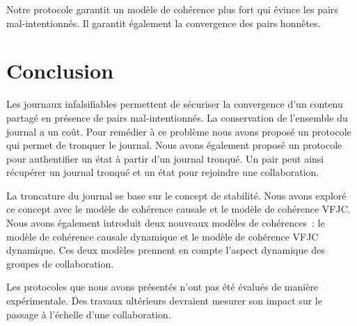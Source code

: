 Notre protocole garantit un modèle de cohérence plus fort qui évince les pairs mal-intentionnés.
Il garantit également la convergence des pairs honnêtes.



\section{Conclusion}

Les journaux infalsifiables permettent de sécuriser la convergence d'un contenu partagé en présence de pairs mal-intentionnés.
La conservation de l'ensemble du journal a un coût.
Pour remédier à ce problème nous avons proposé un protocole qui permet de tronquer le journal.
Nous avons également proposé un protocole pour authentifier un état à partir d'un journal tronqué.
Un pair peut ainsi récupérer un journal tronqué et un état pour rejoindre une collaboration.

La troncature du journal se base sur le concept de stabilité.
Nous avons exploré ce concept avec le modèle de cohérence causale et le modèle de cohérence \ac{VFJC}.
Nous avons également introduit deux nouveaux modèles de cohérences~: le modèle de cohérence causale dynamique et le modèle de cohérence \ac{VFJC} dynamique.
Ces deux modèles prennent en compte l'aspect dynamique des groupes de collaboration.

Les protocoles que nous avons présentés n'ont pas été évalués de manière expérimentale.
Des travaux ultérieurs devraient mesurer son impact sur le passage à l'échelle d'une collaboration.
